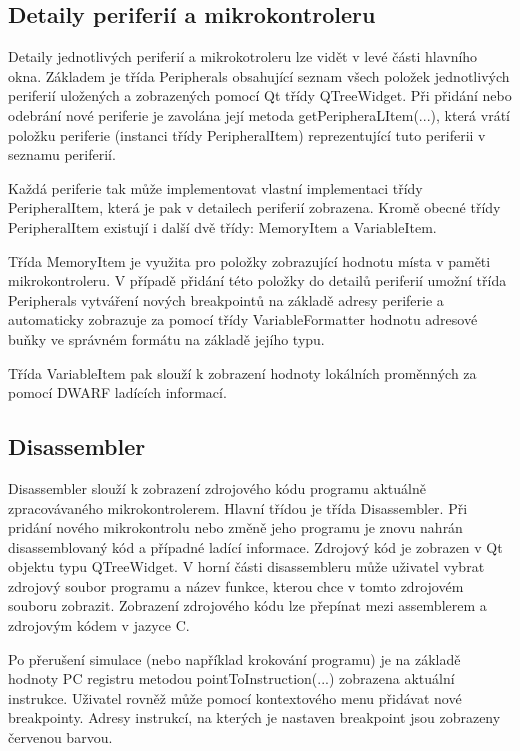 \subsection{Detaily periferií a mikrokontroleru}
\label{detaily_per}

Detaily jednotlivých periferií a mikrokotroleru lze vidět v levé části hlavního okna. Základem je třída Peripherals obsahující seznam všech položek jednotlivých periferií uložených a zobrazených pomocí Qt třídy QTreeWidget. Při přidání nebo odebrání nové periferie je zavolána její metoda getPeripheraLItem(...), která vrátí položku periferie (instanci třídy PeripheralItem) reprezentující tuto periferii v seznamu periferií.

Každá periferie tak může implementovat vlastní implementaci třídy PeripheralItem, která je pak v detailech periferií zobrazena. Kromě obecné třídy PeripheralItem existují i další dvě třídy: MemoryItem a VariableItem.

Třída MemoryItem je využita pro položky zobrazující hodnotu místa v paměti mikrokontroleru. V případě přidání této položky do detailů periferií umožní třída Peripherals vytváření nových breakpointů na základě adresy periferie a automaticky zobrazuje za pomocí třídy VariableFormatter hodnotu adresové buňky ve správném formátu na základě jejího typu.

Třída VariableItem pak slouží k zobrazení hodnoty lokálních proměnných za pomocí DWARF ladících informací.

\subsection{Disassembler}
\label{screen_disassembler}

Disassembler slouží k zobrazení zdrojového kódu programu aktuálně zpracovávaného mikrokontrolerem. Hlavní třídou je třída Disassembler. Při pridání nového mikrokontrolu nebo změně jeho programu je znovu nahrán disassemblovaný kód a případné ladící informace. Zdrojový kód je zobrazen v Qt objektu typu QTreeWidget. V horní části disassembleru může uživatel vybrat zdrojový soubor programu a název funkce, kterou chce v tomto zdrojovém souboru zobrazit. Zobrazení zdrojového kódu lze přepínat mezi assemblerem a zdrojovým kódem v jazyce C.

Po přerušení simulace (nebo například krokování programu) je na základě hodnoty PC registru metodou pointToInstruction(...) zobrazena aktuální instrukce. Uživatel rovněž může pomocí kontextového menu přidávat nové breakpointy. Adresy instrukcí, na kterých je nastaven breakpoint jsou zobrazeny červenou barvou.

